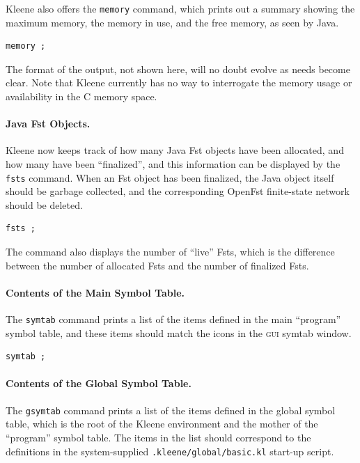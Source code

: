 \documentclass[letterpaper,12pt]{article}
\newcommand{\acro}{\textsc}
\def\CPP{{C\nolinebreak[4]\hspace{-.08em}\raisebox{.3ex}{\footnotesize\bf
+}\nolinebreak\hspace{-.1em}\raisebox{.3ex}{\footnotesize\bf +}}}
\begin{document}
Kleene also offers the \texttt{memory}
command, which prints out a summary showing the maximum memory, the
memory in use, and the free memory, as seen by Java.

\begin{Verbatim}[fontsize=\small]
memory ;
\end{Verbatim}

\noindent
The format of the output, not shown here, will no doubt evolve as needs
become clear.  Note that Kleene currently has no way to interrogate the
memory usage or availability in the \CPP{} memory space.

\paragraph{Java Fst Objects.}

Kleene now keeps track of how many Java Fst objects have been allocated,
and how many have been ``finalized'', and this information can be
displayed by the \texttt{fsts} command.  When an Fst object has been
finalized, the Java object itself should be garbage collected, and the
corresponding OpenFst finite-state network should be deleted.

\begin{Verbatim}[fontsize=\small]
fsts ;
\end{Verbatim}

\noindent
The command also displays the number of ``live'' Fsts, which is the
difference between the number of allocated Fsts and the number of finalized Fsts.

\paragraph{Contents of the Main Symbol Table.}

The \texttt{symtab} command prints a list of the items defined in the main
``program'' symbol table, and these items should match the icons in the \acro{gui} symtab
window.

\begin{Verbatim}[fontsize=\small]
symtab ;
\end{Verbatim}

\paragraph{Contents of the Global Symbol Table.}

The \texttt{gsymtab} command prints a list of the items defined in the global symbol
table, which is the root of the Kleene environment and the mother of the
``program'' symbol table.  The items in the list should correspond to the definitions
in the system-supplied \texttt{.kleene/global/basic.kl} start-up script.
\end{document}
